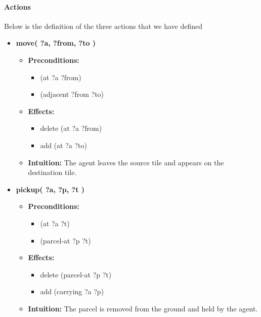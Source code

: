 \paragraph{Actions}
Below is the definition of the three  actions that we have defined
\begin{itemize}[leftmargin=*]
  \item \textbf{move( ?a, ?from, ?to )}
    \begin{itemize}[leftmargin=1.5em]
      \item \textbf{Preconditions:}
        \begin{itemize}
          \item (at ?a ?from)
          \item (adjacent ?from ?to)
        \end{itemize}
      \item \textbf{Effects:}
        \begin{itemize}
          \item delete (at ?a ?from)
          \item add    (at ?a ?to)
        \end{itemize}
      \item \textbf{Intuition:} The agent leaves the source tile and appears on the destination tile.
    \end{itemize}

  \item \textbf{pickup( ?a, ?p, ?t )}
    \begin{itemize}[leftmargin=1.5em]
      \item \textbf{Preconditions:}
        \begin{itemize}
          \item (at ?a ?t)
          \item (parcel-at ?p ?t)
        \end{itemize}
      \item \textbf{Effects:}
        \begin{itemize}
          \item delete (parcel-at ?p ?t)
          \item add    (carrying ?a ?p)
        \end{itemize}
      \item \textbf{Intuition:} The parcel is removed from the ground and held by the agent.
    \end{itemize}


\end{itemize}
